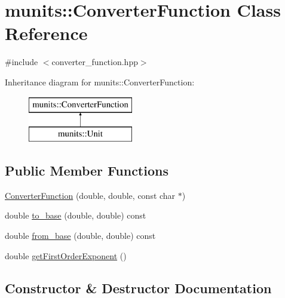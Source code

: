 \hypertarget{classmunits_1_1_converter_function}{}\section{munits\+:\+:Converter\+Function Class Reference}
\label{classmunits_1_1_converter_function}


{\ttfamily \#include $<$converter\+\_\+function.\+hpp$>$}

Inheritance diagram for munits\+:\+:Converter\+Function\+:\begin{figure}[H]
\begin{center}
\leavevmode
\includegraphics[height=2.000000cm]{classmunits_1_1_converter_function}
\end{center}
\end{figure}
\subsection*{Public Member Functions}
\begin{DoxyCompactItemize}
\item 
\hyperlink{classmunits_1_1_converter_function_ade93c9534fa3fdfea3e28012c4a35e71}{Converter\+Function} (double, double, const char $\ast$)
\item 
double \hyperlink{classmunits_1_1_converter_function_a4046b7450750f1becd45b63a811b14f0}{to\+\_\+base} (double, double) const
\item 
double \hyperlink{classmunits_1_1_converter_function_a06dfbd71248463c6d3d4b0cdda251612}{from\+\_\+base} (double, double) const
\item 
double \hyperlink{classmunits_1_1_converter_function_a1b3777fbb09c52bc9456fbae09295cfc}{get\+First\+Order\+Exponent} ()
\end{DoxyCompactItemize}


\subsection{Constructor \& Destructor Documentation}
\mbox{\label{classmunits_1_1_converter_function_ade93c9534fa3fdfea3e28012c4a35e71}} 
